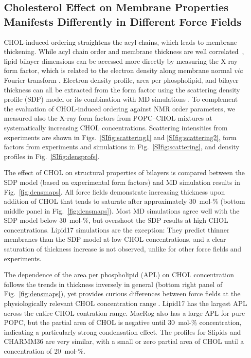 \documentclass[journal=jctcce]{achemso}
\begin{document}
\subsection{Cholesterol Effect on Membrane Properties Manifests Differently in Different Force Fields}

CHOL-induced ordering straightens the acyl chains, which leads to membrane thickening. While acyl chain order and membrane thickness are well correlated~\cite{NMRlipidsDatabank}, lipid bilayer dimensions can be accessed more directly by measuring the X-ray form factor, which is related to the electron density along membrane normal \textit{via} Fourier transform \cite{pan12,Heftberger15,Marquardt15,ollila16}. Electron density profile, area per phospholipid, and bilayer thickness can all be extracted from the form factor using the scattering density profile (SDP) model or its combination with MD simulations  \cite{Kucerka08a,pan12,Heftberger15,Marquardt15,doktorova2020molecular}. To complement the evaluation of CHOL-induced ordering against NMR order parameters, we measured also the X-ray form factors from POPC--CHOL mixtures at systematically increasing CHOL concentrations. Scattering intensities from experiments are shown in Figs.~\ref{SIfig:scattering1} and \ref{SIfig:scattering2}, form factors from experiments and simulations in Fig.~\ref{SIfig:scattering}, and density profiles in Fig.~\ref{SIfig:densprofs}.


The effect of CHOL on structural properties of bilayers is compared between the SDP model (based on experimental form factors) and MD simulation results in Fig.~\ref{fig:densmaps}.  All force fields demonstrate increasing thickness upon addition of CHOL that tends to saturate after approximately 30~mol-\% (bottom middle panel in Fig.~\ref{fig:densmaps}). Most MD simulations agree well with the SDP model below 30~mol-\%, but overshoot the SDP results at high CHOL concentrations. Lipid17 simulations are the exception: They predict thinner membranes than the SDP model at low CHOL concentrations, and a clear saturation of thickness increase is not observed, unlike for other force fields and experiments.

The dependence of the area per phospholipid (APL) on CHOL concentration follows the trends in thickness inversely in general (bottom right panel of Fig.~\ref{fig:densmaps}), yet provides curious differences between force fields at the physiologically relevant CHOL concentration range \cite{van2008membrane}. Lipid17 has the largest APL across the entire CHOL contration range. MacRog also has a large APL for pure POPC, but the partial area of CHOL is negative until 30~mol-\% concentration, indicating a particularly strong condensation effect. The profiles for Slipids and CHARMM36 are very similar, with a small or zero partial area of CHOL until a concentration of 20~mol-\%. 
\end{document}
